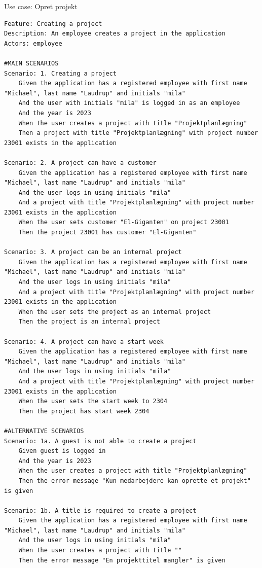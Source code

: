 \begin{listing}[H]
    \centering
    \caption{Use case: Opret projekt}\label{lst:usecase_create_project}
    \begin{verbatim}  
Feature: Creating a project
Description: An employee creates a project in the application
Actors: employee

#MAIN SCENARIOS
Scenario: 1. Creating a project
    Given the application has a registered employee with first name "Michael", last name "Laudrup" and initials "mila"
    And the user with initials "mila" is logged in as an employee
    And the year is 2023
    When the user creates a project with title "Projektplanlægning" 
    Then a project with title "Projektplanlægning" with project number 23001 exists in the application

Scenario: 2. A project can have a customer
    Given the application has a registered employee with first name "Michael", last name "Laudrup" and initials "mila"
    And the user logs in using initials "mila"
    And a project with title "Projektplanlægning" with project number 23001 exists in the application
    When the user sets customer "El-Giganten" on project 23001
    Then the project 23001 has customer "El-Giganten"

Scenario: 3. A project can be an internal project
    Given the application has a registered employee with first name "Michael", last name "Laudrup" and initials "mila"
    And the user logs in using initials "mila"
    And a project with title "Projektplanlægning" with project number 23001 exists in the application
    When the user sets the project as an internal project
    Then the project is an internal project

Scenario: 4. A project can have a start week
    Given the application has a registered employee with first name "Michael", last name "Laudrup" and initials "mila"
    And the user logs in using initials "mila"
    And a project with title "Projektplanlægning" with project number 23001 exists in the application
    When the user sets the start week to 2304
    Then the project has start week 2304

#ALTERNATIVE SCENARIOS
Scenario: 1a. A guest is not able to create a project
    Given guest is logged in
    And the year is 2023
    When the user creates a project with title "Projektplanlægning" 
    Then the error message "Kun medarbejdere kan oprette et projekt" is given

Scenario: 1b. A title is required to create a project
    Given the application has a registered employee with first name "Michael", last name "Laudrup" and initials "mila"
    And the user logs in using initials "mila"
    When the user creates a project with title ""
    Then the error message "En projekttitel mangler" is given
    \end{verbatim}
\end{listing}
